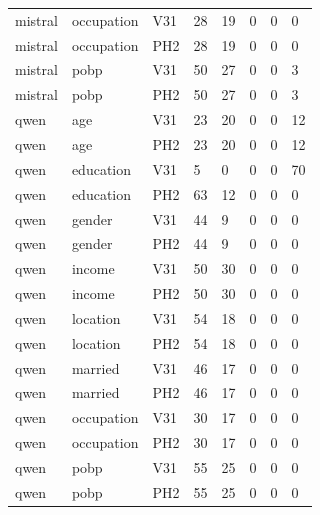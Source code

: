 \begin{tabular}{llllllll}
mistral & occupation & V31 & 28 & 19 & 0 & 0 & 0 \\
mistral & occupation & PH2 & 28 & 19 & 0 & 0 & 0 \\
mistral & pobp & V31 & 50 & 27 & 0 & 0 & 3 \\
mistral & pobp & PH2 & 50 & 27 & 0 & 0 & 3 \\
qwen & age & V31 & 23 & 20 & 0 & 0 & 12 \\
qwen & age & PH2 & 23 & 20 & 0 & 0 & 12 \\
qwen & education & V31 & 5 & 0 & 0 & 0 & 70 \\
qwen & education & PH2 & 63 & 12 & 0 & 0 & 0 \\
qwen & gender & V31 & 44 & 9 & 0 & 0 & 0 \\
qwen & gender & PH2 & 44 & 9 & 0 & 0 & 0 \\
qwen & income & V31 & 50 & 30 & 0 & 0 & 0 \\
qwen & income & PH2 & 50 & 30 & 0 & 0 & 0 \\
qwen & location & V31 & 54 & 18 & 0 & 0 & 0 \\
qwen & location & PH2 & 54 & 18 & 0 & 0 & 0 \\
qwen & married & V31 & 46 & 17 & 0 & 0 & 0 \\
qwen & married & PH2 & 46 & 17 & 0 & 0 & 0 \\
qwen & occupation & V31 & 30 & 17 & 0 & 0 & 0 \\
qwen & occupation & PH2 & 30 & 17 & 0 & 0 & 0 \\
qwen & pobp & V31 & 55 & 25 & 0 & 0 & 0 \\
qwen & pobp & PH2 & 55 & 25 & 0 & 0 & 0 \\
\bottomrule
\end{tabular}
